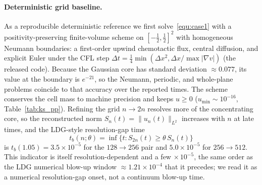 \documentclass[a4paper,fleqn]{cas-sc}
\theoremstyle{definition}
\theoremstyle{remark}
\begin{document}
\paragraph{Deterministic grid baseline.}
As a reproducible deterministic reference we first solve~\eqref{equ:case1} with a positivity-preserving finite-volume scheme on $[-\tfrac12,\tfrac12]^2$ with homogeneous Neumann boundaries: a first-order upwind chemotactic flux, central diffusion, and explicit Euler under the CFL step $\Delta t=\tfrac14\min(\Delta x^2,\Delta x/\max|\nabla v|)$ (the released code).  Because the Gaussian core has standard deviation $\approx0.077$, its value at the boundary is $e^{-21}$, so the Neumann, periodic, and whole-plane problems coincide to that accuracy over the reported times.  The scheme conserves the cell mass to machine precision and keeps $u\ge0$ ($u_{\min}\sim10^{-16}$, Table~\ref{tab:ks_pp}).  Refining the grid $n\to2n$ resolves more of the concentrating core, so the reconstructed norm $S_n(t)=\|u_n(t)\|_{L^2}$ increases with $n$ at late times, and the LDG-style resolution-gap time
\begin{equation}
t_b(n;\theta)=\inf\{t:S_{2n}(t)\ge\theta\,S_n(t)\}
\label{equ:tb}
\end{equation}
is $t_b(1.05)=3.5\times10^{-5}$ for the $128\to256$ pair and $5.0\times10^{-5}$ for $256\to512$.  This indicator is itself resolution-dependent and a few$\,\times10^{-5}$, the same order as the LDG numerical blow-up window $\approx1.21\times10^{-4}$ that it precedes; we read it as a numerical resolution-gap onset, not a continuum blow-up time.
\end{document}
